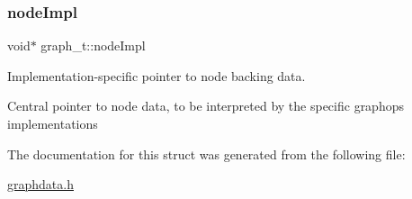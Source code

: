 \mbox{\label{structgraph__t_a3bf6344f03f4cbc69345d026da2e3368}} 
\subsubsection{\texorpdfstring{node\+Impl}{nodeImpl}}
{\footnotesize\ttfamily void$\ast$ graph\+\_\+t\+::node\+Impl}



Implementation-\/specific pointer to node backing data. 

Central pointer to node data, to be interpreted by the specific graphops implementations 

The documentation for this struct was generated from the following file\+:\begin{DoxyCompactItemize}
\item 
\hyperlink{graphdata_8h}{graphdata.\+h}\end{DoxyCompactItemize}

